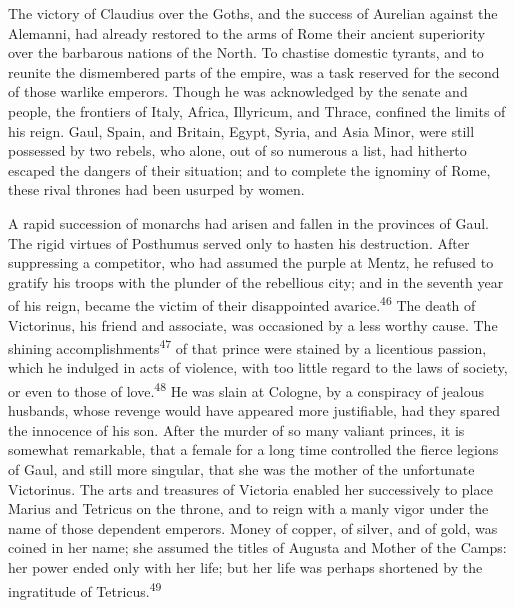 

The victory of Claudius over the Goths, and the success of
Aurelian against the Alemanni, had already restored to the arms
of Rome their ancient superiority over the barbarous nations of
the North. To chastise domestic tyrants, and to reunite the
dismembered parts of the empire, was a task reserved for the
second of those warlike emperors. Though he was acknowledged by
the senate and people, the frontiers of Italy, Africa, Illyricum,
and Thrace, confined the limits of his reign. Gaul, Spain, and
Britain, Egypt, Syria, and Asia Minor, were still possessed by
two rebels, who alone, out of so numerous a list, had hitherto
escaped the dangers of their situation; and to complete the
ignominy of Rome, these rival thrones had been usurped by women.

A rapid succession of monarchs had arisen and fallen in the
provinces of Gaul. The rigid virtues of Posthumus served only to
hasten his destruction. After suppressing a competitor, who had
assumed the purple at Mentz, he refused to gratify his troops
with the plunder of the rebellious city; and in the seventh year
of his reign, became the victim of their disappointed avarice.\textsuperscript{46}
The death of Victorinus, his friend and associate, was occasioned
by a less worthy cause. The shining accomplishments\textsuperscript{47} of that
prince were stained by a licentious passion, which he indulged in
acts of violence, with too little regard to the laws of society,
or even to those of love.\textsuperscript{48} He was slain at Cologne, by a
conspiracy of jealous husbands, whose revenge would have appeared
more justifiable, had they spared the innocence of his son. After
the murder of so many valiant princes, it is somewhat remarkable,
that a female for a long time controlled the fierce legions of
Gaul, and still more singular, that she was the mother of the
unfortunate Victorinus. The arts and treasures of Victoria
enabled her successively to place Marius and Tetricus on the
throne, and to reign with a manly vigor under the name of those
dependent emperors. Money of copper, of silver, and of gold, was
coined in her name; she assumed the titles of Augusta and Mother
of the Camps: her power ended only with her life; but her life
was perhaps shortened by the ingratitude of Tetricus.\textsuperscript{49}

